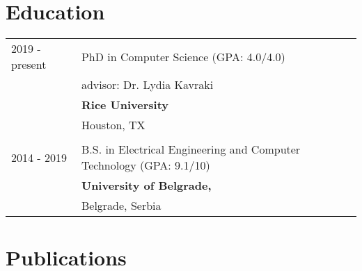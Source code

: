 \documentclass[a4paper,12pt]{article}
\begin{document}



\section{Education}
\begin{tabularx}{\linewidth}{@{}l X@{}}	

2019 - present & PhD in Computer Science \hfill (GPA: 4.0/4.0) \\ 
& advisor: Dr. Lydia Kavraki \\
& \textbf{Rice University} \\
& Houston, TX \\
\\
2014 - 2019 & B.S. in Electrical Engineering and Computer Technology \hfill  (GPA: 9.1/10) \\
& \textbf{University of Belgrade,} \\
& Belgrade, Serbia \\
\end{tabularx}

\section{Publications}
\begin{refsection}
\nocite{*}
\printbibliography[heading=none]
\end{refsection}
\end{document}
